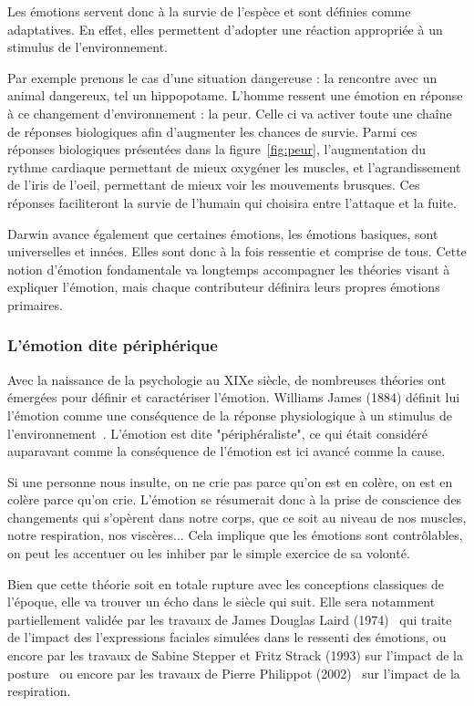 Les émotions servent donc à la survie de l’espèce et sont définies comme adaptatives. En effet, elles permettent d'adopter une réaction appropriée à un stimulus de l'environnement.

Par exemple prenons le cas d'une situation dangereuse : la rencontre avec un animal dangereux, tel un hippopotame. L'homme ressent une émotion en réponse à ce changement d'environnement : la peur. Celle ci va activer toute une chaîne de réponses biologiques afin d'augmenter les chances de survie. Parmi ces réponses biologiques présentées dans la figure~\ref{fig:peur}, l'augmentation du rythme cardiaque permettant de mieux oxygéner les muscles, et l'agrandissement de l'iris de l'oeil, permettant de mieux voir les mouvements brusques. Ces réponses faciliteront la survie de l'humain qui choisira entre l'attaque et la fuite.



Darwin avance également que certaines émotions, les émotions basiques, sont universelles et innées. Elles sont donc à la fois ressentie et comprise de tous. Cette notion d'émotion fondamentale va longtemps accompagner les théories visant à expliquer l'émotion, mais chaque contributeur définira leurs propres émotions primaires.

\subsubsection{L'émotion dite périphérique}
Avec la naissance de la psychologie au XIXe siècle, de nombreuses théories ont émergées pour définir et caractériser l'émotion. Williams James (1884) définit lui l'émotion comme une conséquence de la réponse physiologique à un stimulus de l'environnement~\cite{James1884}. L'émotion est dite "périphéraliste", ce qui était considéré auparavant comme la conséquence de l’émotion est ici avancé comme la cause.

Si une personne nous insulte, on ne crie pas parce qu'on est en colère, on est en colère parce qu'on crie. L'émotion se résumerait donc à la prise de conscience des changements qui s'opèrent dans notre corps, que ce soit au niveau de nos muscles, notre respiration, nos viscères... Cela implique que les émotions sont contrôlables, on peut les accentuer ou les inhiber par le simple exercice de sa volonté.

Bien que cette théorie soit en totale rupture avec les conceptions classiques de l'époque, elle va trouver un écho dans le siècle qui suit. Elle sera notamment partiellement validée par les travaux de James Douglas Laird (1974)~\cite{Laird1974} qui traite de l'impact des l'expressions faciales simulées dans le ressenti des émotions, ou encore par les travaux de Sabine Stepper et Fritz Strack (1993) sur l'impact de la posture~\cite{Stepper1993} ou encore par les travaux de Pierre Philippot (2002)~\cite{Philippot2002} sur l'impact de la respiration.

